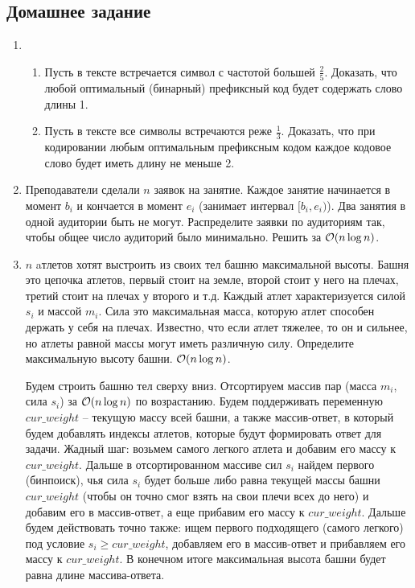 \subsection{Домашнее задание}
\begin{enumerate}
  \item
    \begin{enumerate}
      \item
        Пусть в тексте встречается символ с частотой большей $\frac{2}{5}$.
        Доказать, что любой оптимальный (бинарный) префиксный код будет содержать слово длины 1.

      \item
        Пусть в тексте все символы встречаются реже $\frac{1}{3}$.
        Доказать, что при кодировании любым оптимальным префиксным кодом каждое кодовое слово 
        будет иметь длину не меньше 2.
    \end{enumerate}

  \item
 	Преподаватели сделали $n$ заявок на занятие. Каждое
 	занятие начинается в момент $b_i$ и кончается в момент $e_i$
 	(занимает интервал $[b_i, e_i)$). Два занятия в одной аудитории
 	быть не могут. Распределите заявки по аудиториям так, чтобы
 	общее число аудиторий было минимально. Решить за $\mathcal{O}(n \log n)$.

  \item
    $n$ aтлетов хотят выстроить из своих тел башню максимальной
    высоты. Башня это цепочка атлетов, первый стоит на земле, второй
    стоит у него на плечах, третий стоит на плечах у второго и
    т.д. Каждый атлет характеризуется силой $s_i$ и массой $m_i$. Сила
    это максимальная масса, которую атлет способен держать у себя на
    плечах. Известно, что если атлет тяжелее, то он и сильнее, но
    атлеты равной массы могут иметь различную силу. Определите
    максимальную высоту башни. $\mathcal{O}(n \log n)$.

    \begin{solution}
        Будем строить башню тел сверху вниз. Отсортируем массив пар (масса $m_i$, сила $s_i$) за $\mathcal{O}(n \log n)$ по возрастанию. Будем поддерживать переменную $cur\_weight$ -- текущую массу всей башни, а также массив-ответ, в который будем добавлять индексы атлетов, которые будут формировать ответ для задачи. Жадный шаг: возьмем самого легкого атлета и добавим его массу к $cur\_weight$. Дальше в отсортированном массиве сил $s_i$ найдем первого (бинпоиск), чья сила $s_i$ будет больше либо равна текущей массы башни $cur\_weight$ (чтобы он точно смог взять на свои плечи всех до него) и добавим его в массив-ответ, а еще прибавим его массу к $cur\_weight$. Дальше будем действовать точно также: ищем первого подходящего (самого легкого) под условие $s_i \geq cur\_weight$, добавляем его в массив-ответ и прибавляем его массу к $cur\_weight$. В конечном итоге максимальная высота башни будет равна длине массива-ответа. 
        

\end{solution}
\end{enumerate}
